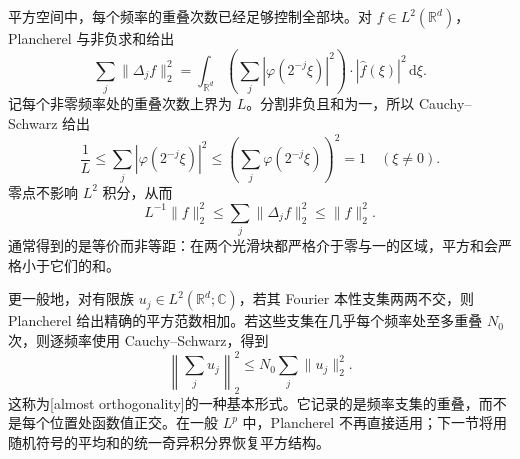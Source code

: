 平方空间中，每个频率的重叠次数已经足够控制全部块。对 \(f\in L^2(\mathbb R^d)\)，Plancherel 与非负求和给出
\[
 \sum_j\|\Delta_jf\|_2^2
 =\int_{\mathbb R^d}
   \left(\sum_j|\varphi(2^{-j}\xi)|^2\right)
                       \cdot|\widehat f(\xi)|^2\,\mathrm d\xi.
\]
记每个非零频率处的重叠次数上界为 \(L\)。分割非负且和为一，所以 Cauchy--Schwarz 给出
\[
 \frac1L\leq\sum_j|\varphi(2^{-j}\xi)|^2
 \leq\left(\sum_j\varphi(2^{-j}\xi)\right)^2=1
 \quad(\xi\ne0).
\]
零点不影响 \(L^2\) 积分，从而
\[
 L^{-1}\|f\|_2^2
 \leq\sum_j\|\Delta_jf\|_2^2\leq\|f\|_2^2.
\]
通常得到的是等价而非等距：在两个光滑块都严格介于零与一的区域，平方和会严格小于它们的和。

\ProseParagraphBreak

更一般地，对有限族 \(u_j\in L^2(\mathbb R^d;\mathbb C)\)，若其 Fourier 本性支集两两不交，则 Plancherel 给出精确的平方范数相加。若这些支集在几乎每个频率处至多重叠 \(N_0\) 次，则逐频率使用 Cauchy--Schwarz，得到
\[
 \left\|\sum_j u_j\right\|_2^2
 \leq N_0\sum_j\|u_j\|_2^2.
\]
这称为[almost orthogonality]的一种基本形式。它记录的是频率支集的重叠，而不是每个位置处函数值正交。在一般 \(L^p\) 中，Plancherel 不再直接适用；下一节将用随机符号的平均和的统一奇异积分界恢复平方结构。
